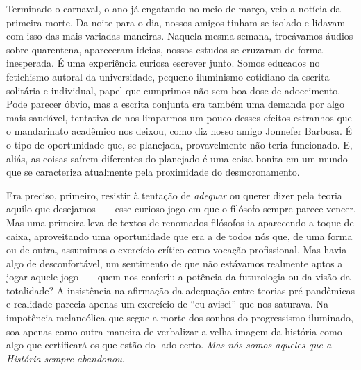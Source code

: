 Terminado o carnaval, o ano já engatando no meio de março, veio a
notícia da primeira morte. Da noite para o dia, nossos amigos tinham se
isolado e lidavam com isso das mais variadas maneiras. Naquela mesma
semana, trocávamos áudios sobre quarentena, apareceram ideias, nossos
estudos se cruzaram de forma inesperada. É uma experiência curiosa
escrever junto. Somos educados no fetichismo autoral da universidade,
pequeno iluminismo cotidiano da escrita solitária e individual, papel
que cumprimos não sem boa dose de adoecimento. Pode parecer óbvio, mas a
escrita conjunta era também uma demanda por algo mais saudável,
tentativa de nos limparmos um pouco desses efeitos estranhos que o
mandarinato acadêmico nos deixou, como diz nosso amigo Jonnefer Barbosa.
É o tipo de oportunidade que, se planejada, provavelmente não teria
funcionado. E, aliás, as coisas saírem diferentes do planejado é uma
coisa bonita em um mundo que se caracteriza atualmente pela proximidade
do desmoronamento.~

Era preciso, primeiro, resistir à tentação de \textit{adequar} ou querer
dizer pela teoria aquilo que desejamos ---- esse curioso jogo em que o
filósofo sempre parece vencer. Mas uma primeira leva de textos de
renomados filósofos ia aparecendo a toque de caixa, aproveitando uma
oportunidade que era a de todos nós que, de uma forma ou de outra,
assumimos o exercício crítico como vocação profissional. Mas havia algo
de desconfortável, um sentimento de que não estávamos realmente aptos a
jogar aquele jogo ---- quem nos conferiu a potência da futurologia ou da
visão da totalidade? A insistência na afirmação da adequação entre
teorias pré-pandêmicas e realidade parecia apenas um exercício de ``eu
avisei'' que nos saturava. Na impotência melancólica que segue a morte
dos sonhos do progressismo iluminado, soa apenas como outra maneira de
verbalizar a velha imagem da história como algo que certificará os que
estão do lado certo. \textit{Mas nós somos aqueles que a História sempre
abandonou}.

